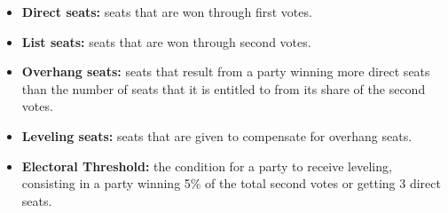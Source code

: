 \documentclass[a4paper]{article}
\begin{document}
\begin{itemize}
  \item \textbf{Direct seats:} seats that are won through first votes.
  \item \textbf{List seats:} seats that are won through second votes.
  \item \textbf{Overhang seats:} seats that result from a party winning more direct seats than the number of seats that it is entitled to from its share of the second votes.
  \item \textbf{Leveling seats:} seats that are given to compensate for overhang seats.
  \item \textbf{Electoral Threshold:} the condition for a party to receive leveling, consisting in a party winning 5\% of the total second votes or getting 3 direct seats.
\end{itemize}
\end{document}
